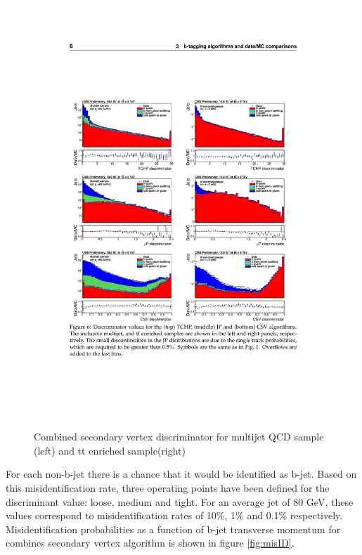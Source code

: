 \begin{figure}[ht]
	\includegraphics[width=\textwidth]{Figures/b-tag_csv.pdf}
	\caption{Combined secondary vertex discriminator for multijet QCD sample (left) and tt enriched sample(right)\cite{CMS:2013vea}}
	\label{fig:csv}
\end{figure}
For each non-b-jet there is a chance that it would be identified as b-jet. Based on this misidentification rate, three operating points have been defined for the discriminant value: loose, medium and tight. For an average jet of 80 GeV, these values correspond to misidentification rates of 10\%, 1\% and 0.1\% respectively. Misidentification probabilities as a function of b-jet transverse momentum for combines secondary vertex algorithm is shown in figure \ref{fig:misID}. 
